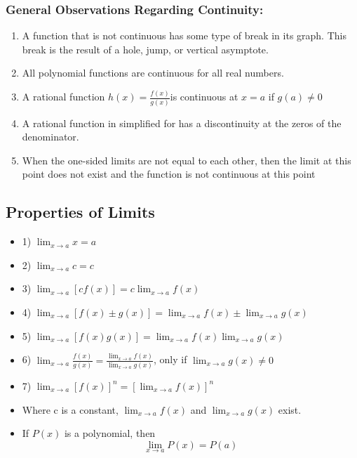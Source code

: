 \documentclass{article}
\begin{document}
\subsubsection{General Observations Regarding Continuity:}
\begin{enumerate}
    \item A function that is not continuous has some type of break in its graph.  This break is the result of a hole, jump, or vertical asymptote.
\item All polynomial functions are continuous for all real numbers.
\item A rational function $h(x)=\frac{f(x)}{g(x)}$is continuous at $x=a$ if $g(a)\neq 0$
\item A rational function in simplified for has a discontinuity at the zeros of the denominator.
\item When the one-sided limits are not equal to each other, then the limit at this point does not exist and the function is not continuous at this point
\end{enumerate}
\subsection{Properties of Limits}
\begin{itemize}
\item 1) $\lim _{x \rightarrow a} x=a$ \\
\item 2) $\lim _{x \rightarrow a} c=c$ \\
\item 3) $\lim _{x \rightarrow a}[c f(x)]=c \lim _{x \rightarrow a} f(x)$ \\
\item 4) $\lim _{x \rightarrow a}[f(x) \pm g(x)]=\lim _{x \rightarrow a} f(x) \pm \lim _{x \rightarrow a} g(x)$\\
\item 5) $\lim _{x \rightarrow a}[f(x) g(x)]=\lim _{x \rightarrow a} f(x) \lim _{x \rightarrow a} g(x)$\\
\item 6) $\lim _{x \rightarrow a} \frac{f(x)}{g(x)}=\frac{\lim _{x \rightarrow a} f(x)}{\lim _{x \rightarrow a} g(x)}$, only if $\lim _{x \rightarrow a} g(x) \neq 0$\\
\item 7) $\lim _{x \rightarrow a}[f(x)]^n=\left[\lim _{x \rightarrow a} f(x)\right]^n$\\

\item Where $\mathrm{c}$ is a constant, $\lim _{x \rightarrow a} f(x)$ and $\lim _{x \rightarrow a} g(x)$ exist.\\

\item If $P(x)$ is a polynomial, then
$$\lim _{x \rightarrow a} P(x)=P(a)$$
\end{itemize}

\newpage
\end{document}
